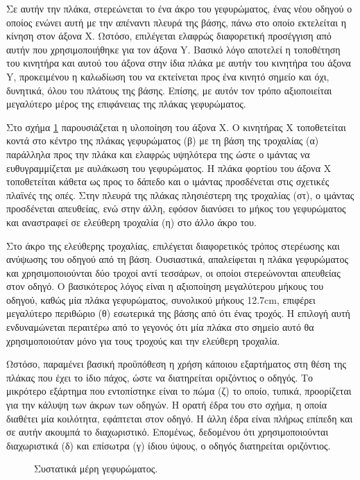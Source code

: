 Σε αυτήν την πλάκα, στερεώνεται το ένα άκρο του γεφυρώματος, ένας νέου οδηγού ο
οποίος ενώνει αυτή με την απέναντι πλευρά της βάσης, πάνω στο οποίο εκτελείται η
κίνηση στον άξονα X.
Ωστόσο, επιλέγεται ελαφρώς διαφορετική προσέγγιση από αυτήν που χρησιμοποιήθηκε
για τον άξονα Y. Βασικό λόγο αποτελεί η τοποθέτηση του κινητήρα και αυτού του
άξονα στην ίδια πλάκα με αυτήν του κινητήρα του άξονα Y, προκειμένου η καλωδίωση
του να εκτείνεται προς ένα κινητό σημείο και όχι, δυνητικά, όλου του πλάτους της
βάσης. Επίσης, με αυτόν τον τρόπο αξιοποιείται μεγαλύτερο μέρος της επιφάνειας
της πλάκας γεφυρώματος.

Στο σχήμα \ref{fig:construct:x-axis-schem} παρουσιάζεται η υλοποίηση του άξονα
X.
Ο κινητήρας X τοποθετείται κοντά στο κέντρο της πλάκας γεφυρώματος (β) με τη
βάση της τροχαλίας (α) παράλληλα προς την πλάκα και ελαφρώς υψηλότερα της ώστε ο
ιμάντας να ευθυγραμμίζεται με αυλάκωση του γεφυρώματος. Η πλάκα φορτίου του
άξονα X τοποθετείται κάθετα ως προς το δάπεδο και ο ιμάντας προσδένεται στις
σχετικές πλαϊνές της οπές. Στην πλευρά της πλάκας πλησιέστερη της τροχαλίας
(στ), ο ιμάντας προσδένεται απευθείας, ενώ στην άλλη, εφόσον διανύσει το μήκος
του γεφυρώματος και αναστραφεί σε ελεύθερη τροχαλία (η) στο άλλο άκρο του.

Στο άκρο της ελεύθερης τροχαλίας, επιλέγεται διαφορετικός τρόπος στερέωσης και
ανύψωσης του οδηγού από τη βάση. Ουσιαστικά, απαλείφεται η πλάκα γεφυρώματος και
χρησιμοποιούνται δύο τροχοί αντί τεσσάρων, οι οποίοι στερεώνονται απευθείας στον
οδηγό. Ο βασικότερος λόγος είναι η αξιοποίηση μεγαλύτερου μήκους του οδηγού,
καθώς μία πλάκα γεφυρώματος, συνολικού μήκους 12.7cm, επιφέρει μεγαλύτερο
περιθώριο (θ) εσωτερικά της βάσης από ότι ένας τροχός. Η επιλογή αυτή
ενδυναμώνεται περαιτέρω από το γεγονός ότι μία πλάκα στο σημείο αυτό θα
χρησιμοποιούταν μόνο για τους τροχούς και την ελεύθερη τροχαλία.

Ωστόσο, παραμένει βασική προϋπόθεση η χρήση κάποιου εξαρτήματος στη θέση της
πλάκας που έχει το ίδιο πάχος, ώστε να διατηρείται οριζόντιος ο οδηγός. Το
μικρότερο εξάρτημα που εντοπίστηκε είναι το πώμα (ζ) το οποίο, τυπικά,
προορίζεται για την κάλυψη των άκρων των οδηγών. Η ορατή έδρα του στο σχήμα, η
οποία διαθέτει μία κοιλότητα, εφάπτεται στον οδηγό. Η άλλη έδρα είναι πλήρως
επίπεδη και σε αυτήν ακουμπά το διαχωριστικό. Επομένως, δεδομένου ότι
χρησιμοποιούνται διαχωριστικά (δ) και επίσωτρα (γ) ίδιου ύψους, ο οδηγός
διατηρείται οριζόντιος.

\begin{figure}
    \caption{Συστατικά μέρη γεφυρώματος. \label{fig:construct:x-axis-schem}}
    \begin{center}%
    \def\svgwidth{\textwidth}
    
    \end{center}
\end{figure}

